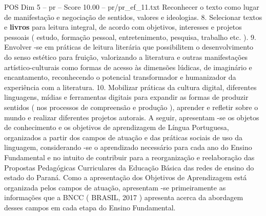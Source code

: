 \begin{textsample}{POS Dim 5 – pr – Score 10.00 – pr/pr\_ef\_11.txt}
Reconhecer o texto como lugar de manifestação e negociação de sentidos, valores e ideologias. 8.
Selecionar textos e \textbf{livros} para leitura integral, de acordo com objetivos, interesses e projetos pessoais ( estudo, formação pessoal, entretenimento, pesquisa, trabalho etc. ). 9.
Envolver -se em práticas de leitura literária que possibilitem o desenvolvimento do senso estético para fruição, valorizando a literatura e outras manifestações artístico-culturais como formas de acesso às dimensões lúdicas, de imaginário e encantamento, reconhecendo o potencial transformador e humanizador da experiência com a literatura. 10.
Mobilizar práticas da cultura digital, diferentes linguagens, mídias e ferramentas digitais para expandir as formas de produzir sentidos ( nos processos de compreensão e produção ), aprender e refletir sobre o mundo e realizar diferentes projetos autorais.
A seguir, apresentam -se os objetos de conhecimento e os objetivos de aprendizagem de Língua Portuguesa, organizados a partir dos campos de atuação e das práticas sociais de uso da linguagem, considerando -se o aprendizado necessário para cada ano do Ensino Fundamental e no intuito de contribuir para a reorganização e reelaboração das Propostas Pedagógicas Curriculares da Educação Básica das redes de ensino do estado do Paraná.
Como a apresentação dos Objetivos de Aprendizagem está organizada pelos campos de atuação, apresentam -se primeiramente as informações que a BNCC ( BRASIL, 2017 ) apresenta acerca da abordagem desses campos em cada etapa do Ensino Fundamental.

\end{textsample}
